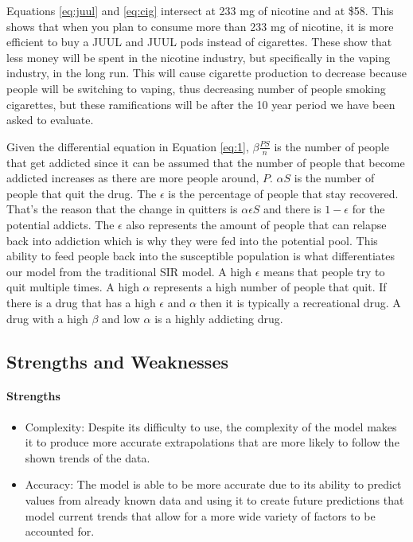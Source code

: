\documentclass[12pt,letterpaper]{article}
\begin{document}
Equations \ref{eq:juul} and \ref{eq:cig} intersect at 233 mg of nicotine and at \$58. This shows that when you plan to consume more than 233 mg of nicotine, it is more efficient to buy a JUUL and JUUL pods instead of cigarettes. These show that less money will be spent in the nicotine industry, but specifically in the vaping industry, in the long run. This will cause cigarette production to decrease because people will be switching to vaping, thus decreasing number of people smoking cigarettes, but these ramifications will be after the 10 year period we have been asked to evaluate.

Given the differential equation in Equation \ref{eq:1}, $\beta \frac{PS}{n}$ is the number of people that get addicted since it can be assumed that the number of people that become addicted increases as there are more people around, $P$. $\alpha S$ is the number of people that quit the drug. The $\epsilon$ is the percentage of people that stay recovered. That's the reason that the change in quitters is $\alpha\epsilon S$ and there is $1-\epsilon$ for the potential addicts. The $\epsilon$ also represents the amount of people that can relapse back into addiction which is why they were fed into the potential pool. This ability to feed people back into the susceptible population is what differentiates our model from the traditional SIR model. A high $\epsilon$ means that people try to quit multiple times. A high $\alpha$ represents a high number of people that quit. If there is a drug that has a high $\epsilon$ and $\alpha$ then it is typically a recreational drug. A drug with a high $\beta$ and low $\alpha$ is a highly addicting drug.  

\subsection{Strengths and Weaknesses}
\paragraph{Strengths}
\begin{itemize}
\item Complexity: Despite its difficulty to use, the complexity of the model makes it to produce more accurate extrapolations that are more likely to follow the shown trends of the data.
\item Accuracy: The model is able to be more accurate due to its ability to predict values from already known data and using it to create future predictions that model current trends that allow for a more wide variety of factors to be accounted for.
\end{itemize}
\end{document}
